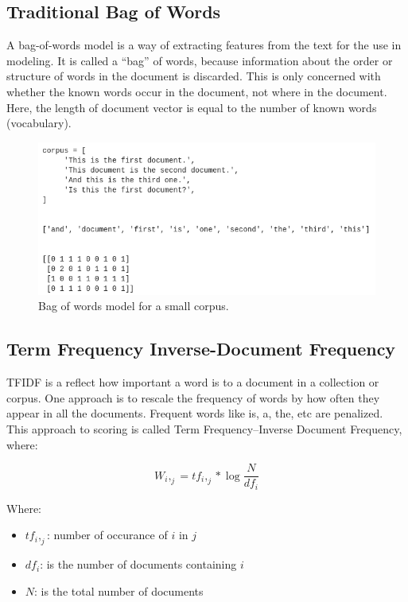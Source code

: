 \subsection{Traditional Bag of Words}
A bag-of-words model is a way of extracting features from the text for the use in modeling. It is called a “bag” of words, because information about the order or structure of words in the document is discarded. This is only concerned with whether the known words occur in the document, not where in the document. Here, the length of document vector is equal to the number of known words (vocabulary). 

\begin{figure}[tbh]
\begin{center}
	\includegraphics[width=5.5in]{images/bagofwords.png}
	\caption{Bag of words model for a small corpus.}
	\label{some_tfidf}
\end{center}
\end{figure}

\newpage

\subsection{Term Frequency Inverse-Document Frequency}
\ac{TFIDF} \cite{Ramos_usingtf-idf} is a reflect how important a word is to a document in a collection or corpus. One approach is to rescale the frequency of words by how often they appear in all the documents. Frequent words like is, a, the, etc are penalized. This approach to scoring is called Term Frequency–Inverse Document Frequency, where: 

\[W_i,_j = tf_i,_j * \log\frac{N}{df_i}\]

Where:
\begin{itemize}
    \item $tf_{i},_{j}$: number of occurance of $i$ in $j$
    \item $df_{i}$: is the number of documents containing $i$
    \item $N$: is the total number of documents
\end{itemize}


